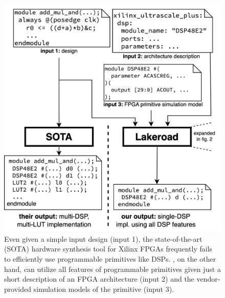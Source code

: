 \begin{figure}
\centering

\includegraphics[width=0.91\columnwidth]{assets/lakeroad-firstpage.drawio.png}

\vspace{-3mm}
\caption{
Even given a simple input
  design (input 1),
  the state-of-the-art (SOTA)
  hardware synthesis tool
  for Xilinx FPGAs
  frequently
  fails to efficiently use 
  programmable primitives
  like DSPs.
\lr,
  on the other hand,
  can utilize all features
  of programmable primitives
  given just a short description
  of an FPGA architecture (input 2)
  and the vendor-provided 
  simulation models
  of the primitive (input 3).\tighten
}
\label{fig:firstpage}

\vspace{-5mm}
\end{figure}
